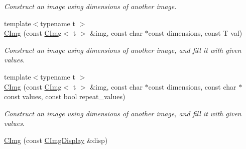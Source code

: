 \begin{DoxyCompactItemize}
\begin{DoxyCompactList}\small\item\em Construct an image using dimensions of another image. \item\end{DoxyCompactList}\item 
\hypertarget{structcimg__library_1_1CImg_a86a2b8265b0feda01e0537b10a70a4b6}{
{\footnotesize template$<$typename t $>$ }\\\hyperlink{structcimg__library_1_1CImg_a86a2b8265b0feda01e0537b10a70a4b6}{CImg} (const \hyperlink{structcimg__library_1_1CImg}{CImg}$<$ t $>$ \&img, const char $\ast$const dimensions, const T val)}
\label{structcimg__library_1_1CImg_a86a2b8265b0feda01e0537b10a70a4b6}

\begin{DoxyCompactList}\small\item\em Construct an image using dimensions of another image, and fill it with given values. \item\end{DoxyCompactList}\item 
\hypertarget{structcimg__library_1_1CImg_a156c2971bf74d4026cfc8ef116a1634d}{
{\footnotesize template$<$typename t $>$ }\\\hyperlink{structcimg__library_1_1CImg_a156c2971bf74d4026cfc8ef116a1634d}{CImg} (const \hyperlink{structcimg__library_1_1CImg}{CImg}$<$ t $>$ \&img, const char $\ast$const dimensions, const char $\ast$const values, const bool repeat\_\-values)}
\label{structcimg__library_1_1CImg_a156c2971bf74d4026cfc8ef116a1634d}

\begin{DoxyCompactList}\small\item\em Construct an image using dimensions of another image, and fill it with given values. \item\end{DoxyCompactList}\item 
\hypertarget{structcimg__library_1_1CImg_aceaeb1e13cdb9e681ddc4341807f6fac}{
\hyperlink{structcimg__library_1_1CImg_aceaeb1e13cdb9e681ddc4341807f6fac}{CImg} (const \hyperlink{structcimg__library_1_1CImgDisplay}{CImgDisplay} \&disp)}
\label{structcimg__library_1_1CImg_aceaeb1e13cdb9e681ddc4341807f6fac}


\end{DoxyCompactItemize}
